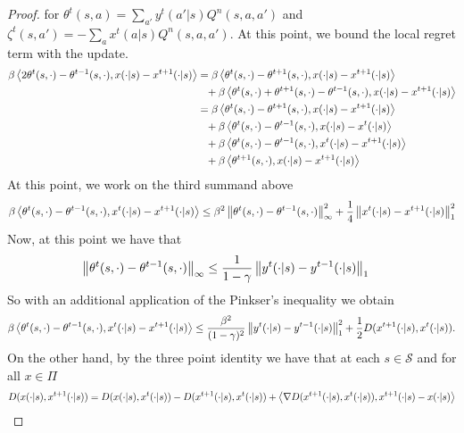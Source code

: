 \begin{proof}
for $\theta^t(s,a) = \sum_{a'} y^t(a'|s) Q^n(s,a,a')$ and $\zeta^t(s,a') = - \sum_{a} x^t(a|s) Q^n(s,a,a')$.
At this point, we bound the local regret term with the \oomdmethod{}  update.
\begin{align*}
 \beta \left\langle{2 \theta^{t}(s,\cdot) - \theta^{t-1}(s, \cdot)},{x(\cdot|s) - x^{t+1}(\cdot|s)}\right\rangle &=  \beta \left\langle{ \theta^{t}(s,\cdot) - \theta^{t+1}(s, \cdot)},{x(\cdot|s) - x^{t+1}(\cdot|s)}\right\rangle \\&\phantom{=} +
 \beta \left\langle{ \theta^{t}(s,\cdot) + \theta^{t+1}(s,\cdot) - \theta^{t-1}(s, \cdot)},{x(\cdot|s) - x^{t+1}(\cdot|s)}\right\rangle \\
&=  \beta \left\langle{ \theta^{t}(s,\cdot) - \theta^{t+1}(s, \cdot)},{x(\cdot|s) - x^{t+1}(\cdot|s)}\right\rangle \\
&\phantom{=}+  \beta \left\langle{ \theta^{t}(s,\cdot) - \theta^{t-1}(s, \cdot)},{x(\cdot|s) - x^{t}(\cdot|s)}\right\rangle \\
&\phantom{=}+  \beta \left\langle{ \theta^{t}(s,\cdot) - \theta^{t-1}(s, \cdot)},{x^t(\cdot|s) - x^{t+1}(\cdot|s)}\right\rangle \\
&\phantom{=}+ \beta \left\langle{ \theta^{t+1}(s, \cdot)},{x(\cdot|s) - x^{t+1}(\cdot|s)}\right\rangle
\end{align*}
At this point, we work on the third summand above
\begin{align*}
 \beta \left\langle{ \theta^{t}(s,\cdot) - \theta^{t-1}(s, \cdot)},{x^t(\cdot|s) - x^{t+1}(\cdot|s)}\right\rangle \leq  \beta^2 \left\lVert\theta^t(s, \cdot) - \theta^{t-1}(s,\cdot)\right\rVert_{\infty}^2 + \frac{1}{4}\left\lVert x^t(\cdot|s) - x^{t+1}(\cdot|s)\right\rVert_{1}^2
\end{align*}
Now, at this point we have that
\begin{align*}
\left\lVert\theta^t(s, \cdot) - \theta^{t-1}(s,\cdot)\right\rVert_{\infty} &\leq \frac{1}{1 - \gamma} \left\lVert y^{t}(\cdot|s) - y^{t-1}(\cdot|s)\right\rVert_1
\end{align*}
So with an additional application of the Pinkser's inequality we obtain
\begin{align*}
 \beta \left\langle{ \theta^{t}(s,\cdot) - \theta^{t-1}(s, \cdot)},{x^t(\cdot|s) - x^{t+1}(\cdot|s)}\right\rangle \leq  \frac{ \beta^2}{(1 - \gamma)^2} \left\lVert y^{t}(\cdot|s) - y^{t-1}(\cdot|s)\right\rVert^2_1 + \frac{1}{2}D(x^{t+1}(\cdot|s),x^t(\cdot|s)).
\end{align*}
On the other hand, by the three point identity we have that at each $s \in \mathcal{S}$ and for all $x \in \Pi$
\begin{equation*}
D(x(\cdot|s),x^{t+1}(\cdot|s)) = D(x(\cdot|s),x^{t}(\cdot|s)) - D(x^{t+1}(\cdot|s),x^{t}(\cdot|s)) + \innerprod{\nabla D(x^{t+1}(\cdot|s), x^t(\cdot|s))}{x^{t+1}(\cdot|s) - x(\cdot|s)}

\end{equation*}
\end{proof}
